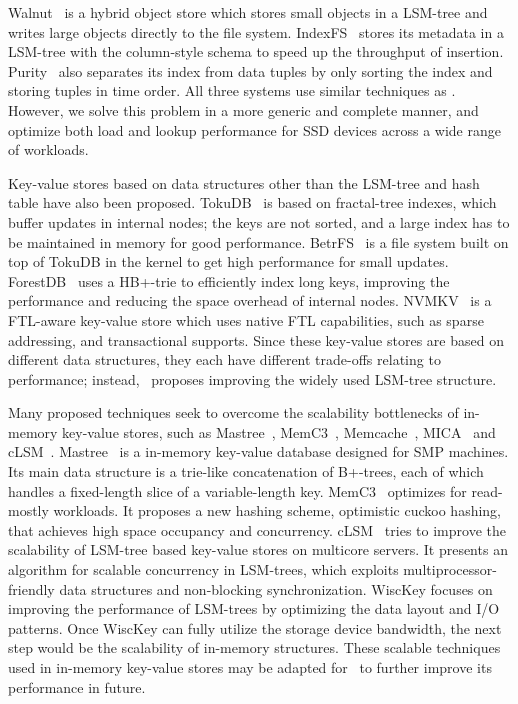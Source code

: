 Walnut~\cite{walnut} is a hybrid object store which stores
small objects in a LSM-tree and writes large objects directly to the
file system. IndexFS~\cite{indexfs} stores its metadata in a LSM-tree
with the column-style schema to speed up the throughput of insertion. 
Purity~\cite{purity} also separates its index from data tuples by only
sorting the index and storing tuples in time order. All three
systems use similar techniques as \toolname.  However, we solve this
problem in a more generic and complete manner, and optimize both load
and lookup performance for SSD devices across a wide range of workloads. 

Key-value stores based on data structures other than the LSM-tree and hash
table have also been proposed.
TokuDB~\cite{BenderEtAl07-SPAA,BuchsbaumEtAl00-SODA} is based on fractal-tree
indexes, which buffer updates in internal nodes; the keys are not sorted, and a
large index has to be maintained in memory for good performance. 
BetrFS~\cite{JannenEtAl15-BetrFS} is a file system built on top
of TokuDB in the kernel to get high performance for small updates.
ForestDB~\cite{Ahn15-ForestDB} uses a HB+-trie to efficiently index long keys,
improving the performance and reducing the space overhead of internal nodes.
NVMKV~\cite{MarmolEtAl15-USENIX} is a FTL-aware key-value store which uses
native FTL capabilities, such as sparse addressing, and
transactional supports. Since these key-value stores are based on different
data structures, they each have different trade-offs relating to performance;
instead, \toolname\ proposes improving the widely used LSM-tree structure.

Many proposed techniques seek to overcome the scalability bottlenecks of
in-memory key-value stores, such as Mastree~\cite{MaoEtAl12-EUROSYS},
MemC3~\cite{FanEtAl13-NSDI}, Memcache~\cite{NishtalaEtAl13-NSDI},
MICA~\cite{LimEtAl14-NSDI} and cLSM~\cite{GuyEtAl15-Eurosys}. 
Mastree~\cite{MaoEtAl12-EUROSYS} is a in-memory key-value database
designed for SMP machines.  Its main data structure is a trie-like
concatenation of B+-trees, each of which handles a fixed-length slice
of a variable-length key. MemC3~\cite{FanEtAl13-NSDI} optimizes for
read-mostly workloads. It proposes a new hashing scheme, optimistic
cuckoo hashing, that achieves high space occupancy and concurrency. 
cLSM~\cite{GuyEtAl15-Eurosys} tries to improve the scalability of
LSM-tree based key-value stores on multicore servers. It presents an
algorithm for scalable concurrency in LSM-trees, which exploits
multiprocessor-friendly data structures and non-blocking
synchronization. WiscKey focuses on improving the performance of
LSM-trees by optimizing the data layout and I/O patterns. Once WiscKey
can fully utilize the storage device bandwidth, the next step would be
the scalability of in-memory structures. These scalable techniques
used in in-memory key-value stores may be adapted for \toolname\ to 
further improve its performance in future. 


